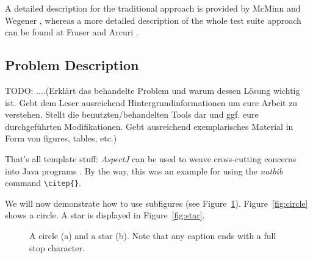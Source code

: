 \documentclass[pdftex,english,oribibl]{llncs}
\begin{document}
A detailed description for the traditional approach is provided by McMinn \citep{mcminn2004search} and Wegener \citep{wegener2001evolutionary},  whereas a more detailed description of the whole test suite approach can be found at Fraser and Arcuri \citep{fraser2015achieving}.

\subsection{Problem Description} 


TODO:
....(Erklärt das behandelte Problem und warum dessen Lösung wichtig ist. Gebt dem Leser ausreichend Hintergrundinformationen um eure Arbeit zu verstehen. Stellt die benutzten/behandelten Tools dar und ggf. eure durchgeführten Modifikationen. Gebt ausreichend exemplarisches Material in Form von figures, tables, etc.)

That's all template stuff:  \textit{AspectJ} can be used to weave cross-cutting concerns into Java programs \citep{AspectJ2007}. By the way, this was an example for using the \textit{natbib} command \texttt{\textbackslash{}citep\{\}}.

  We will now demonstrate how to use subfigures (see Figure~\ref{fig:subfig}). Figure~\ref{fig:circle} shows a circle. A star is displayed in Figure~\ref{fig:star}.

  \begin{figure}
    \centering
    \caption{A circle (a) and a star (b). Note that any caption ends with a full stop character.}
    \label{fig:subfig}
  \end{figure}
\end{document}
